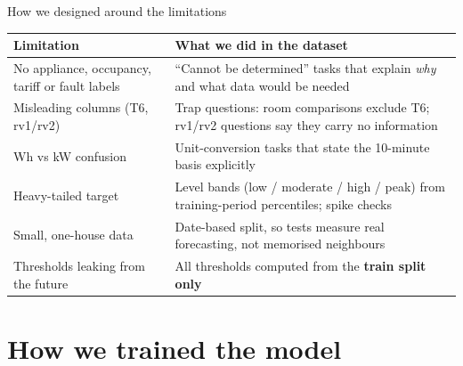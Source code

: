 \documentclass[aspectratio=169,11pt]{beamer}
\begin{document}
\begin{frame}{How we designed around the limitations}
  \small
  \begin{tabularx}{\textwidth}{@{}>{\raggedright\arraybackslash}p{} L@{}}
    \toprule
    \textbf{Limitation} & \textbf{What we did in the dataset} \\
    \midrule
    No appliance, occupancy, tariff or fault labels & ``Cannot be determined'' tasks that explain \emph{why} and what data would be needed \\
    Misleading columns (T6, rv1/rv2) & Trap questions: room comparisons exclude T6; rv1/rv2 questions say they carry no information \\
    Wh vs kW confusion & Unit-conversion tasks that state the 10-minute basis explicitly \\
    Heavy-tailed target & Level bands (low / moderate / high / peak) from training-period percentiles; spike checks \\
    Small, one-house data & Date-based split, so tests measure real forecasting, not memorised neighbours \\
    Thresholds leaking from the future & All thresholds computed from the \textbf{train split only} \\
    \bottomrule
  \end{tabularx}
\end{frame}

\section{How we trained the model}
\end{document}
